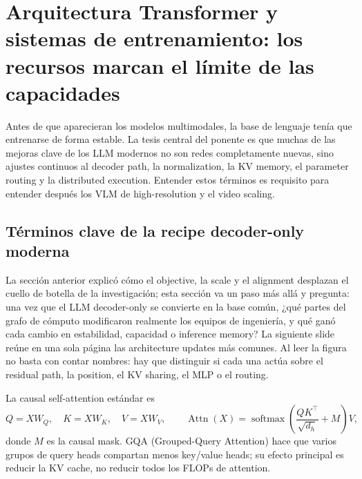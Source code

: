 \section{Arquitectura Transformer y sistemas de entrenamiento: los recursos marcan el límite de las capacidades}

Antes de que aparecieran los modelos multimodales, la base de lenguaje tenía que entrenarse de forma estable. La tesis central del ponente es que muchas de las mejoras clave de los LLM modernos no son redes completamente nuevas, sino ajustes continuos al decoder path, la normalization, la KV memory, el parameter routing y la distributed execution. Entender estos términos es requisito para entender después los VLM de high-resolution y el video scaling.

\subsection{Términos clave de la recipe decoder-only moderna}

La sección anterior explicó cómo el objective, la scale y el alignment desplazan el cuello de botella de la investigación; esta sección va un paso más allá y pregunta: una vez que el LLM decoder-only se convierte en la base común, ¿qué partes del grafo de cómputo modificaron realmente los equipos de ingeniería, y qué ganó cada cambio en estabilidad, capacidad o inference memory? La siguiente slide reúne en una sola página las architecture updates más comunes. Al leer la figura no basta con contar nombres: hay que distinguir si cada una actúa sobre el residual path, la position, el KV sharing, el MLP o el routing.


La causal self-attention estándar es
\[
Q=XW_Q,\quad K=XW_K,\quad V=XW_V,\qquad
\operatorname{Attn}(X)=\operatorname{softmax}\!\left(\frac{QK^\top}{\sqrt{d_h}}+M\right)V,
\]
donde $M$ es la causal mask. GQA (Grouped-Query Attention) hace que varios grupos de query heads compartan menos key/value heads; su efecto principal es reducir la KV cache, no reducir todos los FLOPs de attention.

